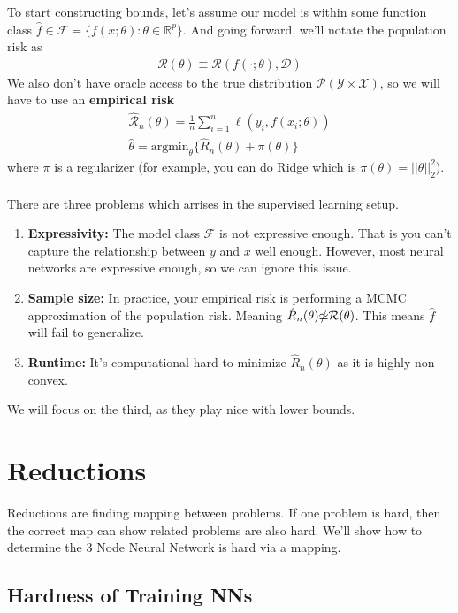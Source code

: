 To start constructing bounds, let's assume our model is within some function class $\hat f \in \mathcal F = \{f(x;\theta) : \theta \in \mathbb R^p\}$. And going forward, we'll notate the population risk as 
\begin{align}
	\mathcal R(\theta) \equiv \mathcal R(f(\cdot; \theta), \mathcal D)	
\end{align}
We also don't have oracle access to the true distribution $\mathcal P(\mathcal Y \times \mathcal X)$, so we will have to use an \textbf{empirical risk}
\begin{align}
	\hat{\mathcal R}_n(\theta) = \frac{1}{n} \sum_{i=1}^n \ell(y_i, f(x_i; \theta))\\
	\hat \theta = \text{argmin}_\theta \{\hat R_n(\theta) + \pi (\theta)\}
\end{align}
where $\pi$ is a regularizer (for example, you can do Ridge which is $\pi(\theta) = ||\theta||_2^2$).
\\
\\
There are three problems which arrises in the supervised learning setup.
\begin{enumerate}
	\item \textbf{Expressivity:} The model class $\mathcal F$ is not expressive enough. That is you can't capture the relationship between $y$ and $x$ well enough. However, most neural networks are expressive enough, so we can ignore this issue.
	\item \textbf{Sample size:} In practice, your empirical risk is performing a MCMC approximation of the population risk. Meaning  $\hat R_n(\theta) \slashed \simeq \mathcal R(\theta)$. This means $\hat f$ will fail to generalize.
	\item \textbf{Runtime:} It's computational hard to minimize $\hat R_n(\theta)$ as it is highly non-convex.
\end{enumerate}
We will focus on the third, as they play nice with lower bounds.


\section{Reductions}
Reductions are finding mapping between problems. If one problem is hard, then the correct map can show related problems are also hard. We'll show how to determine the 3 Node Neural Network is hard via a mapping.
\subsection{Hardness of Training NNs}
